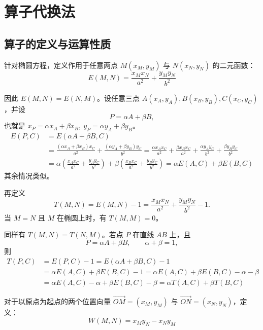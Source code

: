 \chapter{算子代换法}
\section{算子的定义与运算性质}
\begin{definition}[算子 $E$]
    针对椭圆方程，定义作用于任意两点 $M(x_M, y_M)$ 与 $N(x_N, y_N)$ 的二元函数：
$$ E(M, N) = \frac{x_M x_N}{a^2} + \frac{y_M y_N}{b^2} $$
\end{definition}
因此 $E(M,N)=E(N,M)$。设任意三点 $A(x_A, y_A), B(x_B, y_B), C(x_C, y_C)$，并设
\[
P=\alpha A+\beta B,
\]
也就是 $x_P = \alpha x_A + \beta x_B,\ y_P = \alpha y_A + \beta y_B$。
\begin{align*}
E(P, C) &= E( \alpha A + \beta B, C) \\
&=\frac{(\alpha x_A + \beta x_B)x_C}{a^2} + \frac{(\alpha y_A + \beta y_B)y_C}{b^2}  = \frac{\alpha x_A x_C}{a^2} + \frac{\beta x_B x_C}{a^2} + \frac{\alpha y_A y_C}{b^2} + \frac{\beta y_B y_C}{b^2} \\
&= \alpha \left( \frac{x_A x_C}{a^2} + \frac{y_A y_C}{b^2} \right) + \beta \left( \frac{x_B x_C}{a^2} + \frac{y_B y_C}{b^2} \right) =\alpha E(A,C) + \beta E(B,C) 
\end{align*}
其余情况类似。
\begin{definition}[算子 $T$]
再定义
$$ T(M, N) = E(M, N) - 1 = \frac{x_M x_N}{a^2} + \frac{y_M y_N}{b^2} - 1. $$
当 $M=N$ 且 $M$ 在椭圆上时，有 $T(M,M)=0$。
\end{definition}
同样有 $T(M,N)=T(N,M)$。若点 $P$ 在直线 $AB$ 上，且
\[
P=\alpha A+\beta B,\qquad \alpha+\beta=1,
\]
则
\begin{align*}
  T(P,C) &= E(P,C) - 1  =E( \alpha  A + \beta B,C) - 1  \\
  &=\alpha E(A,C) + \beta E(B,C) - 1 =\alpha E(A,C) + \beta E(B,C)-\alpha - \beta\\
  &= \alpha E(A,C) - \alpha + \beta E(B,C) - \beta= \alpha T(A,C) + \beta T(B,C)
\end{align*}
\begin{definition}[外积 $W$]
对于以原点为起点的两个位置向量 $\overrightarrow{OM} = (x_M, y_M)$ 与 $\overrightarrow{ON} = (x_N, y_N)$，定义：
$$ W(M, N) = x_M y_N - x_N y_M $$
\end{definition}
